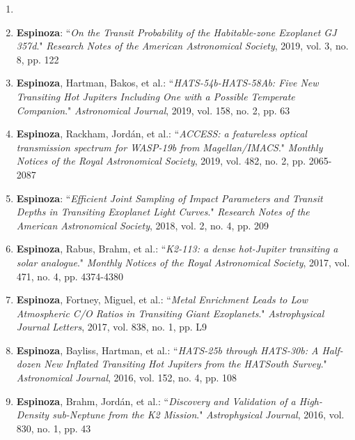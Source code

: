 \documentclass[12pt, a4paper]{article} %
\begin{document}
\begin{flushleft}
\begin{enumerate}
\item  {}

\item \textbf{Espinoza}: ``\textit{On the Transit Probability of the Habitable-zone Exoplanet GJ 357d}." \textit{Research Notes of the American Astronomical Society}, 2019, vol. 3, no. 8, pp. 122

\item \textbf{Espinoza}, Hartman, Bakos, et al.: ``\textit{HATS-54b-HATS-58Ab: Five New Transiting Hot Jupiters Including One with a Possible Temperate Companion}." \textit{Astronomical Journal}, 2019, vol. 158, no. 2, pp. 63

\item \textbf{Espinoza}, Rackham, Jordán, et al.: ``\textit{ACCESS: a featureless optical transmission spectrum for WASP-19b from Magellan/IMACS}." \textit{Monthly Notices of the Royal Astronomical Society}, 2019, vol. 482, no. 2, pp. 2065-2087

\item \textbf{Espinoza}: ``\textit{Efficient Joint Sampling of Impact Parameters and Transit Depths in Transiting Exoplanet Light Curves}." \textit{Research Notes of the American Astronomical Society}, 2018, vol. 2, no. 4, pp. 209

\item \textbf{Espinoza}, Rabus, Brahm, et al.: ``\textit{K2-113: a dense hot-Jupiter transiting a solar analogue}." \textit{Monthly Notices of the Royal Astronomical Society}, 2017, vol. 471, no. 4, pp. 4374-4380

\item \textbf{Espinoza}, Fortney, Miguel, et al.: ``\textit{Metal Enrichment Leads to Low Atmospheric C/O Ratios in Transiting Giant Exoplanets}." \textit{Astrophysical Journal Letters}, 2017, vol. 838, no. 1, pp. L9

\item \textbf{Espinoza}, Bayliss, Hartman, et al.: ``\textit{HATS-25b through HATS-30b: A Half-dozen New Inflated Transiting Hot Jupiters from the HATSouth Survey}." \textit{Astronomical Journal}, 2016, vol. 152, no. 4, pp. 108

\item \textbf{Espinoza}, Brahm, Jordán, et al.: ``\textit{Discovery and Validation of a High-Density sub-Neptune from the K2 Mission}." \textit{Astrophysical Journal}, 2016, vol. 830, no. 1, pp. 43


\end{enumerate}
\end{flushleft}
\end{document}
